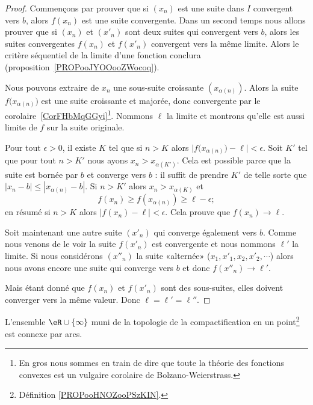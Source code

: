 \begin{proof}
	Commençons par prouver que si \( (x_n)\) est une suite dans \( I\) convergent vers \( b\), alors \( f(x_n)\) est une suite convergente. Dans un second temps nous allons prouver que si \( (x_n)\) et \( (x'_n)\) sont deux suites qui convergent vers \( b\), alors les suites convergentes \( f(x_n)\) et \( f(x'_n)\) convergent vers la même limite. Alors le critère séquentiel de la limite d'une fonction conclura (proposition~\ref{PROPooJYOOooZWocoq}).

	Nous pouvons extraire de \( x_n\) une sous-suite croissante \( (x_{\alpha(n)})\). Alors la suite \( f\big( x_{\alpha(n)} \big)\) est une suite croissante et majorée, donc convergente par le corolaire~\ref{CorFHbMqGGyi}\footnote{En gros nous sommes en train de dire que toute la théorie des fonctions convexes est un vulgaire corolaire de Bolzano-Weierstrass.}. Nommons \( \ell\) la limite et montrons qu'elle est aussi limite de \( f\) sur la suite originale.

	Pour tout \( \epsilon>0\), il existe \( K\) tel que si \( n>K\) alors \( \big| f\big( x_{\alpha(n)} \big)-\ell \big|<\epsilon\). Soit \( K'\) tel que pour tout \( n>K'\) nous ayons \( x_n>x_{\alpha(K')}\). Cela est possible parce que la suite est bornée par \( b\) et converge vers \( b\) : il suffit de prendre \( K'\) de telle sorte que \( | x_n-b |\leq | x_{\alpha(n)}-b |\). Si \( n>K'\) alors \( x_n>x_{\alpha(K)}\) et
	\begin{equation}
		f(x_n)\geq f(x_{\alpha(n)})\geq \ell-\epsilon;
	\end{equation}
	en résumé si \( n>K\) alors \( | f(x_n)-\ell |<\epsilon\). Cela prouve que \( f(x_n)\to\ell\).

	Soit maintenant une autre suite \( (x'_n)\) qui converge également vers \( b\). Comme nous venons de le voir la suite \( f(x'_n)\) est convergente et nous nommons \( \ell'\) la limite. Si nous considérons \( (x''_n)\) la suite «alternée» (\( x_1,x'_1,x_2,x'_2,\cdots\)) alors nous avons encore une suite qui converge vers \( b\) et donc \( f(x''_n)\to \ell'\).

	Mais étant donné que \( f(x_n)\) et \( f(x'_n)\) sont des sous-suites, elles doivent converger vers la même valeur. Donc \( \ell=\ell'=\ell''\).
\end{proof}


\begin{proposition}      \label{PROPooLOQVooULDhZz}
	L'ensemble \( \eR\cup\{ \infty \}\) muni de la topologie de la compactification en un point\footnote{Définition \ref{PROPooHNOZooPSzKIN}.} est connexe par arcs.
\end{proposition}

